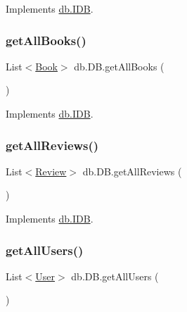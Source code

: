 Implements \hyperlink{interfacedb_1_1_i_d_b_a2ac985a90e8369fab676950b3fb4c2bc}{db.\+I\+DB}.

\mbox{\label{classdb_1_1_d_b_ab4fbfd3716967ce37cc462ca04c68ca8}} 
\subsubsection{\texorpdfstring{get\+All\+Books()}{getAllBooks()}}
{\footnotesize\ttfamily List$<$\hyperlink{classserver_1_1data_1_1_book}{Book}$>$ db.\+D\+B.\+get\+All\+Books (\begin{DoxyParamCaption}{ }\end{DoxyParamCaption})}



Implements \hyperlink{interfacedb_1_1_i_d_b_abd0d41674bbcdd524a3ca2403504bf25}{db.\+I\+DB}.

\mbox{\label{classdb_1_1_d_b_ac7a84c5621f4ad2263cd830dbf10842e}} 
\subsubsection{\texorpdfstring{get\+All\+Reviews()}{getAllReviews()}}
{\footnotesize\ttfamily List$<$\hyperlink{classserver_1_1data_1_1_review}{Review}$>$ db.\+D\+B.\+get\+All\+Reviews (\begin{DoxyParamCaption}{ }\end{DoxyParamCaption})}



Implements \hyperlink{interfacedb_1_1_i_d_b_a08f60c8b923599c650f04b4192d00d55}{db.\+I\+DB}.

\mbox{\label{classdb_1_1_d_b_ad02e4c78f9afe64af34fb2e5889ce501}} 
\subsubsection{\texorpdfstring{get\+All\+Users()}{getAllUsers()}}
{\footnotesize\ttfamily List$<$\hyperlink{classserver_1_1data_1_1_user}{User}$>$ db.\+D\+B.\+get\+All\+Users (\begin{DoxyParamCaption}{ }\end{DoxyParamCaption})}



